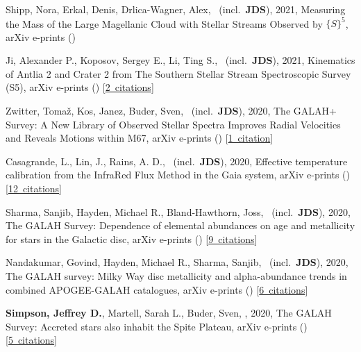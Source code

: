 \item[{\color{numcolor}\scriptsize9}] Shipp, Nora, Erkal, Denis, Drlica-Wagner, Alex, \etal\ (incl.\ \textbf{JDS}), 2021, Measuring the Mass of the Large Magellanic Cloud with Stellar Streams Observed by ${\{}S{\}}^5$, arXiv e-prints ()

\item[{\color{numcolor}\scriptsize8}] Ji, Alexander P., Koposov, Sergey E., Li, Ting S., \etal\ (incl.\ \textbf{JDS}), 2021, Kinematics of Antlia 2 and Crater 2 from The Southern Stellar Stream Spectroscopic Survey (S5), arXiv e-prints () [\href{https://ui.adsabs.harvard.edu/#abs/2021arXiv210612656J}{2~citations}]

\item[{\color{numcolor}\scriptsize7}] Zwitter, Toma{\v{z}}, Kos, Janez, Buder, Sven, \etal\ (incl.\ \textbf{JDS}), 2020, The GALAH+ Survey: A New Library of Observed Stellar Spectra Improves Radial Velocities and Reveals Motions within M67, arXiv e-prints () [\href{https://ui.adsabs.harvard.edu/#abs/2020arXiv201212201Z}{1~citation}]

\item[{\color{numcolor}\scriptsize6}] Casagrande, L., Lin, J., Rains, A. D., \etal\ (incl.\ \textbf{JDS}), 2020, Effective temperature calibration from the InfraRed Flux Method in the Gaia system, arXiv e-prints () [\href{https://ui.adsabs.harvard.edu/#abs/2020arXiv201102517C}{12~citations}]

\item[{\color{numcolor}\scriptsize5}] Sharma, Sanjib, Hayden, Michael R., Bland-Hawthorn, Joss, \etal\ (incl.\ \textbf{JDS}), 2020, The GALAH Survey: Dependence of elemental abundances on age and metallicity for stars in the Galactic disc, arXiv e-prints () [\href{https://ui.adsabs.harvard.edu/#abs/2020arXiv201113818S}{9~citations}]

\item[{\color{numcolor}\scriptsize4}] Nandakumar, Govind, Hayden, Michael R., Sharma, Sanjib, \etal\ (incl.\ \textbf{JDS}), 2020, The GALAH survey: Milky Way disc metallicity and alpha-abundance trends in combined APOGEE-GALAH catalogues, arXiv e-prints () [\href{https://ui.adsabs.harvard.edu/#abs/2020arXiv201102783N}{6~citations}]

\item[{\color{numcolor}\scriptsize3}] \textbf{Simpson, Jeffrey D.}, Martell, Sarah L., Buder, Sven, \etal, 2020, The GALAH Survey: Accreted stars also inhabit the Spite Plateau, arXiv e-prints () [\href{https://ui.adsabs.harvard.edu/#abs/2020arXiv201102659S}{5~citations}]


